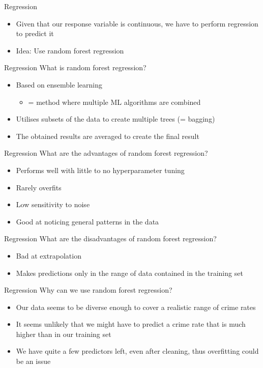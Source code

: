 \documentclass{beamer}
\begin{document}
	\begin{frame}{Regression}
		\begin{itemize}
			\item Given that our response variable is continuous, we have to perform regression to predict it
			\item Idea: Use random forest regression
		\end{itemize}
	\end{frame}
	\begin{frame}{Regression}
		What is random forest regression?
		\begin{itemize}
			\item Based on ensemble learning
			\begin{itemize}
				\item = method where multiple ML algorithms are combined
			\end{itemize}
			\item Utilises subsets of the data to create multiple trees (= bagging)
			\item The obtained results are averaged to create the final result
		\end{itemize}
	\end{frame}
	\begin{frame}{Regression}
		What are the advantages of random forest regression?
		\begin{itemize}
			\item Performs well with little to no hyperparameter tuning
			\item Rarely overfits
			\item Low sensitivity to noise
			\item Good at noticing general patterns in the data
		\end{itemize}
	\end{frame}
	\begin{frame}{Regression}
		What are the disadvantages of random forest regression?
		\begin{itemize}
			\item Bad at extrapolation
			\item Makes predictions only in the range of data contained in the training set
		\end{itemize}
	\end{frame}
	\begin{frame}{Regression}
		Why can we use random forest regression?
		\begin{itemize}
			\item Our data seems to be diverse enough to cover a realistic range of crime rates
			\item It seems unlikely that we might have to predict a crime rate that is much higher than in our training set
			\item We have quite a few predictors left, even after cleaning, thus overfitting could be an issue
		\end{itemize}
	\end{frame}
	
\end{document}
